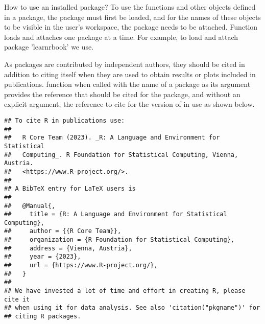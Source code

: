 \documentclass[krantz2]{krantz}\usepackage{knitr}
\begin{document}
\begin{faqbox}{How to use an installed package?}
To use the functions and other objects defined in a package, the package must first be loaded, and for the names of these objects to be visible in the user's workspace, the package needs to be attached. Function  loads and attaches one package at a time. For example, to load and attach package 'learnrbook' we use.

\begin{knitrout}\footnotesize
{}\color{fgcolor}\begin{kframe}
\begin{alltt}
\hlstd{(}\hlstd{)}
\end{alltt}
\end{kframe}
\end{knitrout}

\end{faqbox}

As packages are contributed by independent authors, they should be cited in addition to citing \Rpgrm itself when they are used to obtain results or plots included in publications. \Rlang function  when called with the name of a package as its argument provides the reference that should be cited for the package, and without an explicit argument, the reference to cite for the version of \Rlang in use as shown below.

\begin{knitrout}\footnotesize
{}\color{fgcolor}\begin{kframe}
\begin{alltt}
\hlstd{()}
\end{alltt}
\begin{verbatim}
## To cite R in publications use:
## 
##   R Core Team (2023). _R: A Language and Environment for Statistical
##   Computing_. R Foundation for Statistical Computing, Vienna, Austria.
##   <https://www.R-project.org/>.
## 
## A BibTeX entry for LaTeX users is
## 
##   @Manual{,
##     title = {R: A Language and Environment for Statistical Computing},
##     author = {{R Core Team}},
##     organization = {R Foundation for Statistical Computing},
##     address = {Vienna, Austria},
##     year = {2023},
##     url = {https://www.R-project.org/},
##   }
## 
## We have invested a lot of time and effort in creating R, please cite it
## when using it for data analysis. See also 'citation("pkgname")' for
## citing R packages.
\end{verbatim}
\end{kframe}
\end{knitrout}
\end{document}
